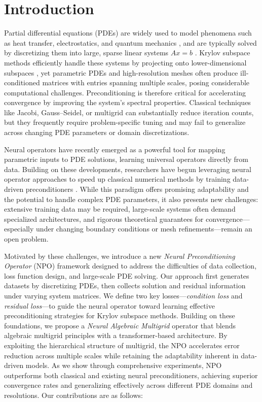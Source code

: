 \section{Introduction}
Partial differential equations (PDEs) are widely used to model phenomena such as heat transfer, electrostatics, and quantum mechanics \cite{82:AnIntro,87:Levy,02:PDE,20:Turbulence}, and are typically solved by discretizing them into large, sparse linear systems \(A x = b\) \cite{77:Numerical}. Krylov subspace methods efficiently handle these systems by projecting onto lower-dimensional subspaces \cite{07:Computational}, yet parametric PDEs and high-resolution meshes often produce ill-conditioned matrices with entries spanning multiple scales, posing considerable computational challenges. Preconditioning is therefore critical for accelerating convergence by improving the system’s spectral properties. Classical techniques like Jacobi, Gauss--Seidel, or multigrid \cite{00:tutorial} can substantially reduce iteration counts, but they frequently require problem-specific tuning and may fail to generalize across changing PDE parameters or domain discretizations.

Neural operators \cite{21:deeponet,21:fno,21:Choose} have recently emerged as a powerful tool for mapping parametric inputs to PDE solutions, learning universal operators directly from data. Building on these developments, researchers have begun leveraging neural operator approaches to speed up classical numerical methods by training data-driven preconditioners \cite{19:LearningNeural,23:LearningPre,24:fcg-no}. While this paradigm offers promising adaptability and the potential to handle complex PDE parameters, it also presents new challenges: extensive training data may be required, large-scale systems often demand specialized architectures, and rigorous theoretical guarantees for convergence—especially under changing boundary conditions or mesh refinements—remain an open problem.

Motivated by these challenges, we introduce a new \emph{Neural Preconditioning Operator} (NPO) framework designed to address the difficulties of data collection, loss function design, and large-scale PDE solving. Our approach first generates datasets by discretizing PDEs, then collects solution and residual information under varying system matrices. We define two key losses—\emph{condition loss} and \emph{residual loss}—to guide the neural operator toward learning effective preconditioning strategies for Krylov subspace methods. Building on these foundations, we propose a \emph{Neural Algebraic Multigrid} operator that blends algebraic multigrid principles with a transformer-based architecture. By exploiting the hierarchical structure of multigrid, the NPO accelerates error reduction across multiple scales while retaining the adaptability inherent in data-driven models. As we show through comprehensive experiments, NPO outperforms both classical and existing neural preconditioners, achieving superior convergence rates and generalizing effectively across different PDE domains and resolutions. Our contributions are as follows:

